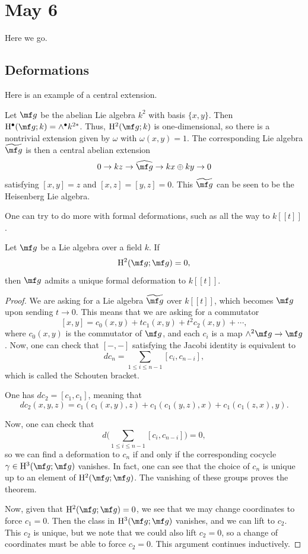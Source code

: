 \documentclass[../notes.tex]{subfiles}
\begin{document}
\section{May 6}
Here we go.

\subsection{Deformations}
Here is an example of a central extension.
\begin{example}
	Let $\mf g$ be the abelian Lie algebra $k^2$ with basis $\{x,y\}$. Then $\mathrm H^\bullet(\mf g;k)=\land^\bullet k^{2*}$. Thus, $\mathrm H^2(\mf g;k)$ is one-dimensional, so there is a nontrivial extension given by $\omega$ with $\omega(x,y)=1$. The corresponding Lie algebra $\widetilde{\mf g}$ is then a central abelian extension
	\[0\to kz\to\widehat{\mf g}\to kx\oplus ky\to0\]
	satisfying $[x,y]=z$ and $[x,z]=[y,z]=0$. This $\widetilde{\mf g}$ can be seen to be the Heisenberg Lie algebra.
\end{example}
One can try to do more with formal deformations, such as all the way to $k[[t]]$.
\begin{proposition} \label{prop:deform-lie-algebra}
	Let $\mf g$ be a Lie algebra over a field $k$. If
	\[\mathrm H^2(\mf g;\mf g)=0,\]
	then $\mf g$ admits a unique formal deformation to $k[[t]]$.
\end{proposition}
\begin{proof}
	We are asking for a Lie algebra $\widetilde{\mf g}$ over $k[[t]]$, which becomes $\mf g$ upon sending $t\to0$. This means that we are asking for a commutator
	\[[x,y]=c_0(x,y)+tc_1(x,y)+t^2c_2(x,y)+\cdots,\]
	where $c_0(x,y)$ is the commutator of $\mf g$, and each $c_i$ is a map $\land^2\mf g\to\mf g$. Now, one can check that $[-,-]$ satisfying the Jacobi identity is equivalent to
	\[dc_n=\sum_{1\le i\le n-1}[c_i,c_{n-i}],\]
	which is called the Schouten bracket.
	\begin{example}
		One has $dc_2=[c_1,c_1]$, meaning that
		\[dc_2(x,y,z)=c_1(c_1(x,y),z)+c_1(c_1(y,z),x)+c_1(c_1(z,x),y).\]
	\end{example}
	Now, one can check that
	\[d\Bigg(\sum_{1\le i\le n-1}[c_i,c_{n-i}]\Bigg)=0,\]
	so we can find a deformation to $c_n$ if and only if the corresponding cocycle $\gamma\in\mathrm H^3(\mf g;\mf g)$ vanishes. In fact, one can see that the choice of $c_n$ is unique up to an element of $\mathrm H^2(\mf g;\mf g)$. The vanishing of these groups proves the theorem.

	Now, given that $\mathrm H^2(\mf g;\mf g)=0$, we see that we may change coordinates to force $c_1=0$. Then the class in $\mathrm H^3(\mf g;\mf g)$ vanishes, and we can lift to $c_2$. This $c_2$ is unique, but we note that we could also lift $c_2=0$, so a change of coordinates must be able to force $c_2=0$. This argument continues inductively.
\end{proof}
\end{document}

